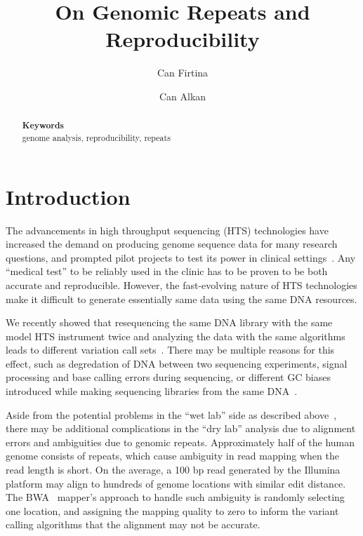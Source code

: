 \documentclass[10pt,a4paper]{article}
\date{}
\def\keywords#1{\begin{center}{\bf Keywords}\\{#1}\end{center}}
\def\titulo#1{\title{#1}}
\begin{document}
\titulo{On Genomic Repeats and Reproducibility}

\author[1]{Can Firtina}
\author[1]{Can Alkan}

\maketitle
\thispagestyle{empty}


\begin{abstract}

\keywords{genome analysis, reproducibility, repeats}
\end{abstract}

\section{Introduction}
The advancements in high throughput sequencing (HTS) technologies have increased the demand on producing genome sequence data for many research questions, and prompted pilot projects to test its
power in clinical settings~\cite{Biesecker2009}. Any ``medical test'' to be reliably used in the clinic has to be proven to be both accurate and reproducible.
However, the fast-evolving nature of HTS technologies make it difficult to generate essentially same data using the same DNA resources. 

We recently showed that resequencing the same DNA library 
with the same model HTS instrument twice and analyzing the data with the same algorithms leads to different variation call sets~\cite{Kavak2015}. There may be multiple reasons for this effect,
such as degredation of DNA between two sequencing experiments, signal processing and base calling errors during sequencing, or different GC biases introduced while making sequencing libraries from the
same DNA~\cite{Kavak2015}. 

Aside from the potential problems in the ``wet lab'' side as described above~\cite{Kavak2015}, 
there may be additional complications in the ``dry lab'' analysis due to alignment errors and ambiguities due to genomic repeats.
Approximately half of the human genome consists of repeats, which cause ambiguity in read mapping when the read length is short. On the average, a 100 bp read generated by the Illumina platform may align to hundreds of genome locations with similar edit distance. 
The BWA~\cite{Li2009a} mapper's  approach to handle such ambiguity is randomly selecting one location, and assigning the mapping quality to zero to inform the variant calling algorithms that the alignment may not be accurate. 
\end{document}
